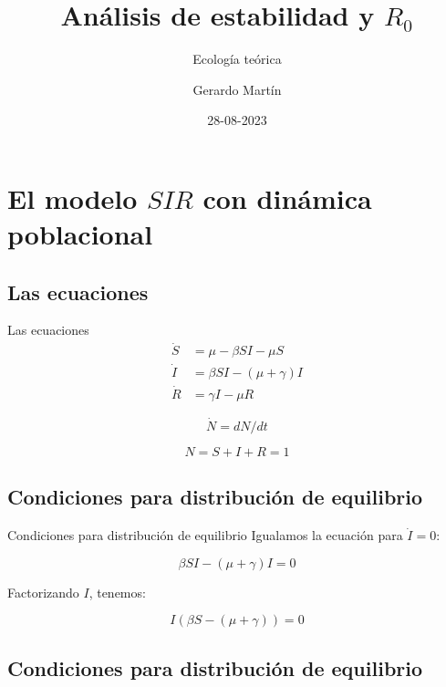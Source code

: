 \documentclass[
  11pt,
  ignorenonframetext,
]{beamer}
\title{Análisis de estabilidad y \(R_0\)}
\subtitle{Ecología teórica}
\author{Gerardo Martín}
\date{28-08-2023}
\begin{document}
\frame{\titlepage}

\hypertarget{el-modelo-sir-con-dinuxe1mica-poblacional}{%
\section{\texorpdfstring{El modelo \(SIR\) con dinámica
poblacional}{El modelo SIR con dinámica poblacional}}\label{el-modelo-sir-con-dinuxe1mica-poblacional}}

\hypertarget{las-ecuaciones}{%
\subsection{Las ecuaciones}\label{las-ecuaciones}}

\begin{frame}{Las ecuaciones}
\begin{align}
  \dot{S} & =\mu - \beta S I - \mu S\\
  \dot{I} & = \beta S I  - (\mu + \gamma) I \\
  \dot{R} & = \gamma I - \mu R
\end{align}

\[\dot{N} = dN / dt\]

\[ N = S + I + R = 1\]
\end{frame}

\hypertarget{condiciones-para-distribuciuxf3n-de-equilibrio}{%
\subsection{Condiciones para distribución de
equilibrio}\label{condiciones-para-distribuciuxf3n-de-equilibrio}}

\begin{frame}{Condiciones para distribución de equilibrio}
Igualamos la ecuación para \(\dot{I} = 0\):

\[\beta SI - (\mu + \gamma)I = 0\]

Factorizando \(I\), tenemos:

\[I(\beta S - (\mu + \gamma))=0\]
\end{frame}

\hypertarget{condiciones-para-distribuciuxf3n-de-equilibrio-1}{%
\subsection{Condiciones para distribución de
equilibrio}\label{condiciones-para-distribuciuxf3n-de-equilibrio-1}}
\end{document}
